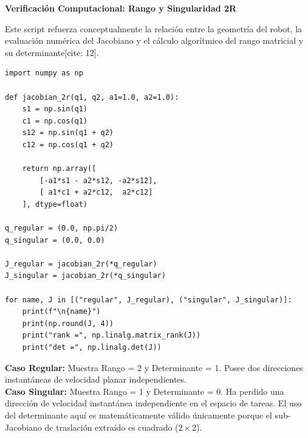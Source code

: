 \documentclass[11pt, a4paper]{article}
\begin{document}
\begin{center}
    \Large\textbf{\textcolor{ucbblue}{Verificación Computacional: Rango y Singularidad 2R}}\\[0.2cm]
\end{center}

Este script refuerza conceptualmente la relación entre la geometría del robot, la evaluación numérica del Jacobiano y el cálculo algorítmico del rango matricial y su determinante[cite: 12].

\begin{lstlisting}
import numpy as np

def jacobian_2r(q1, q2, a1=1.0, a2=1.0):
    s1 = np.sin(q1)
    c1 = np.cos(q1)
    s12 = np.sin(q1 + q2)
    c12 = np.cos(q1 + q2)

    return np.array([
        [-a1*s1 - a2*s12, -a2*s12],
        [ a1*c1 + a2*c12,  a2*c12]
    ], dtype=float)

q_regular = (0.0, np.pi/2)
q_singular = (0.0, 0.0)

J_regular = jacobian_2r(*q_regular)
J_singular = jacobian_2r(*q_singular)

for name, J in [("regular", J_regular), ("singular", J_singular)]:
    print(f"\n{name}")
    print(np.round(J, 4))
    print("rank =", np.linalg.matrix_rank(J))
    print("det =", np.linalg.det(J))
\end{lstlisting}

\begin{tcolorbox}[colback=white, colframe=ucbblue, title=\textbf{Interpretación Física de la Salida[cite: 12]}]
\textbf{Caso Regular:} Muestra Rango = 2 y Determinante = 1. Posee dos direcciones instantáneas de velocidad planar independientes. \\
\textbf{Caso Singular:} Muestra Rango = 1 y Determinante = 0. Ha perdido una dirección de velocidad instantánea independiente en el espacio de tareas. El uso del determinante aquí es matemáticamente válido únicamente porque el sub-Jacobiano de traslación extraído es cuadrado ($2 \times 2$).
\end{tcolorbox}
\end{document}
